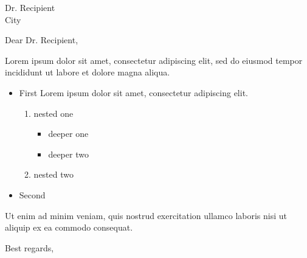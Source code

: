 \documentclass[12pt]{letter}
\begin{document}
\begin{letter}{Dr. Recipient \\ City}
\opening{Dear Dr. Recipient,}

Lorem ipsum dolor sit amet, consectetur adipiscing elit, sed do eiusmod tempor incididunt ut labore et dolore magna aliqua.
\begin{itemize}
\item First Lorem ipsum dolor sit amet, consectetur adipiscing elit.
\begin{enumerate}
\item nested one
\begin{itemize}
\item deeper one
\item deeper two
\end{itemize}
\item nested two
\end{enumerate}
\item Second
\end{itemize}
Ut enim ad minim veniam, quis nostrud exercitation ullamco laboris nisi ut aliquip ex ea commodo consequat.

\closing{Best regards,}
\end{letter}
\end{document}

